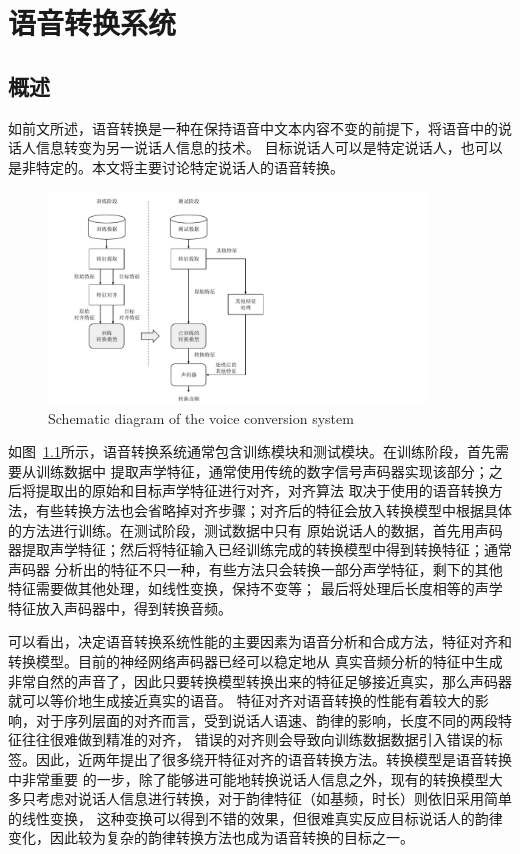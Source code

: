 \chapter{语音转换系统}

\section{概述}

如前文所述，语音转换是一种在保持语音中文本内容不变的前提下，将语音中的说话人信息转变为另一说话人信息的技术。
目标说话人可以是特定说话人，也可以是非特定的。本文将主要讨论特定说话人的语音转换。

\begin{figure}[!htp]
    \centering
    \includegraphics[width=10cm,trim=50 0 310 0,clip]{figure/2_vc_basis.pdf}
    {Schematic diagram of the voice conversion system}
    \label{fig:vc_basis}
\end{figure}

如图~\ref{fig:vc_basis}所示，语音转换系统通常包含训练模块和测试模块。在训练阶段，首先需要从训练数据中
提取声学特征，通常使用传统的数字信号声码器实现该部分；之后将提取出的原始和目标声学特征进行对齐，对齐算法
取决于使用的语音转换方法，有些转换方法也会省略掉对齐步骤；对齐后的特征会放入转换模型中根据具体的方法进行训练。在测试阶段，测试数据中只有
原始说话人的数据，首先用声码器提取声学特征；然后将特征输入已经训练完成的转换模型中得到转换特征；通常声码器
分析出的特征不只一种，有些方法只会转换一部分声学特征，剩下的其他特征需要做其他处理，如线性变换，保持不变等；
最后将处理后长度相等的声学特征放入声码器中，得到转换音频。

可以看出，决定语音转换系统性能的主要因素为语音分析和合成方法，特征对齐和转换模型。目前的神经网络声码器已经可以稳定地从
真实音频分析的特征中生成非常自然的声音了，因此只要转换模型转换出来的特征足够接近真实，那么声码器就可以等价地生成接近真实的语音。
特征对齐对语音转换的性能有着较大的影响，对于序列层面的对齐而言，受到说话人语速、韵律的影响，长度不同的两段特征往往很难做到精准的对齐，
错误的对齐则会导致向训练数据数据引入错误的标签。因此，近两年提出了很多绕开特征对齐的语音转换方法。转换模型是语音转换中非常重要
的一步，除了能够进可能地转换说话人信息之外，现有的转换模型大多只考虑对说话人信息进行转换，对于韵律特征（如基频，时长）则依旧采用简单的线性变换，
这种变换可以得到不错的效果，但很难真实反应目标说话人的韵律变化，因此较为复杂的韵律转换方法也成为语音转换的目标之一。

